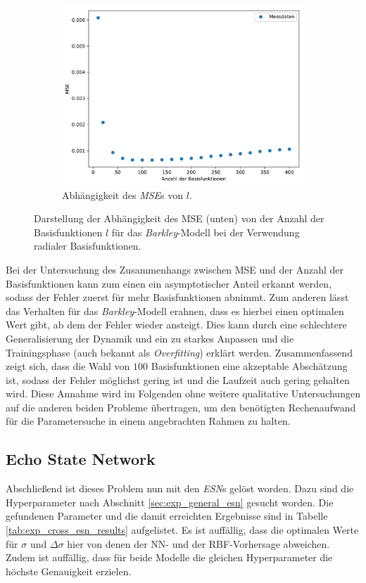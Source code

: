 \begin{figure}[h]
	\centering
	\begin{subfigure}{\textwidth}
		\centering
		\includegraphics[width=4.2in]{figures/results/cross_prediction/rbf_placements_uv_mse.pdf}
  		\caption{Abhängigkeit des \textit{MSE}s von $l$.}
	\end{subfigure}%
	
	\caption{Darstellung der Abhängigkeit des MSE (unten) von der Anzahl der Basisfunktionen $l$ für das \textit{Barkley}-Modell bei der Verwendung radialer Basisfunktionen.}
	\label{fig:exp_cross_rbf_placements_mse_barkley}
\end{figure}

Bei der Untersuchung des Zusammenhangs zwischen MSE und der Anzahl der Basisfunktionen kann zum einen ein asymptotischer Anteil erkannt werden, sodass der Fehler zuerst für mehr Basisfunktionen abnimmt. Zum anderen lässt das Verhalten für das \textit{Barkley}-Modell erahnen, dass es hierbei einen optimalen Wert gibt, ab dem der Fehler wieder ansteigt. Dies kann durch eine schlechtere Generalisierung der Dynamik und ein zu starkes Anpassen und die Trainingsphase (auch bekannt als \textit{Overfitting}) erklärt werden. Zusammenfassend zeigt sich, dass die Wahl von $100$ Basisfunktionen eine akzeptable Abschätzung ist, sodass der Fehler möglichst gering ist und die Laufzeit auch gering gehalten wird. Diese Annahme wird im Folgenden ohne weitere qualitative Untersuchungen auf die anderen beiden Probleme übertragen, um den benötigten Rechenaufwand für die Parametersuche in einem angebrachten Rahmen zu halten.  

\FloatBarrier
\subsection{Echo State Network}
Abschließend ist dieses Problem nun mit den \textit{ESN}s gelöst worden. Dazu sind die Hyperparameter nach Abschnitt \ref{sec:exp_general_esn} gesucht worden. Die gefundenen Parameter und die damit erreichten Ergebnisse sind in Tabelle \ref{tab:exp_cross_esn_results} aufgelistet. Es ist auffällig, dass die optimalen Werte für $\sigma$ und $\Delta \sigma$ hier von denen der NN- und der RBF-Vorhersage abweichen. Zudem ist auffällig, dass für beide Modelle die gleichen Hyperparameter die höchste Genauigkeit erzielen. \\

